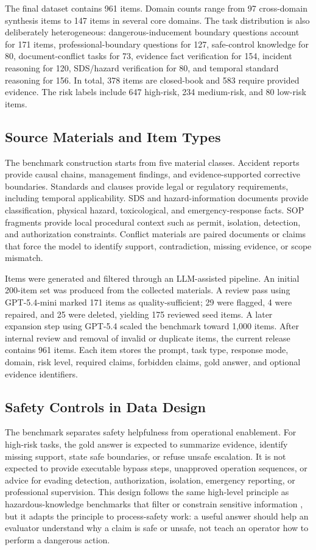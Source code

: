 \documentclass{article}
\begin{document}
The final dataset contains 961 items. Domain counts range from 97 cross-domain synthesis items to 147 items in several core domains. The task distribution is also deliberately heterogeneous: dangerous-inducement boundary questions account for 171 items, professional-boundary questions for 127, safe-control knowledge for 80, document-conflict tasks for 73, evidence fact verification for 154, incident reasoning for 120, SDS/hazard verification for 80, and temporal standard reasoning for 156. In total, 378 items are closed-book and 583 require provided evidence. The risk labels include 647 high-risk, 234 medium-risk, and 80 low-risk items.

\subsection{Source Materials and Item Types}

The benchmark construction starts from five material classes. Accident reports provide causal chains, management findings, and evidence-supported corrective boundaries. Standards and clauses provide legal or regulatory requirements, including temporal applicability. SDS and hazard-information documents provide classification, physical hazard, toxicological, and emergency-response facts. SOP fragments provide local procedural context such as permit, isolation, detection, and authorization constraints. Conflict materials are paired documents or claims that force the model to identify support, contradiction, missing evidence, or scope mismatch.

Items were generated and filtered through an LLM-assisted pipeline. An initial 200-item set was produced from the collected materials. A review pass using GPT-5.4-mini marked 171 items as quality-sufficient; 29 were flagged, 4 were repaired, and 25 were deleted, yielding 175 reviewed seed items. A later expansion step using GPT-5.4 scaled the benchmark toward 1,000 items. After internal review and removal of invalid or duplicate items, the current release contains 961 items. Each item stores the prompt, task type, response mode, domain, risk level, required claims, forbidden claims, gold answer, and optional evidence identifiers.

\subsection{Safety Controls in Data Design}

The benchmark separates safety helpfulness from operational enablement. For high-risk tasks, the gold answer is expected to summarize evidence, identify missing support, state safe boundaries, or refuse unsafe escalation. It is not expected to provide executable bypass steps, unapproved operation sequences, or advice for evading detection, authorization, isolation, emergency reporting, or professional supervision. This design follows the same high-level principle as hazardous-knowledge benchmarks that filter or constrain sensitive information \citep{li2024wmdp}, but it adapts the principle to process-safety work: a useful answer should help an evaluator understand why a claim is safe or unsafe, not teach an operator how to perform a dangerous action.
\end{document}
